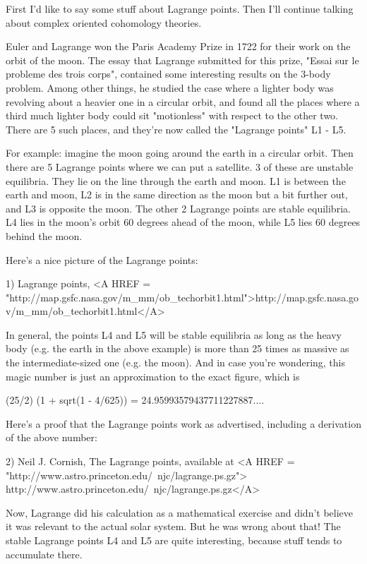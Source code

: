 

First I'd like to say some stuff about Lagrange points.  Then I'll
continue talking about complex oriented cohomology theories.

Euler and Lagrange won the Paris Academy Prize in 1722 for their work 
on the orbit of the moon.  The essay that Lagrange submitted for this
prize, "Essai sur le probleme des trois corps", contained some
interesting results on the 3-body problem.  Among other things, he
studied the case where a lighter body was revolving about a heavier one
in a circular orbit, and found all the places where a third much lighter
body could sit "motionless" with respect to the other two.  
There are 5
such places, and they're now called the "Lagrange points" L1 - L5.  

For example: imagine the moon going around the earth in a circular
orbit.  Then there are 5 Lagrange points where we can put a satellite.
3 of these are unstable equilibria.  They lie on the line through the 
earth and moon.  L1 is between the earth and moon, L2 is in the same 
direction as the moon but a bit further out, and L3 is opposite the moon.  
The other 2 Lagrange points are stable equilibria.  L4 lies in the moon's
orbit 60 degrees ahead of the moon, while L5 lies 60 degrees behind the 
moon.  

Here's a nice picture of the Lagrange points: 

1) Lagrange points, <A HREF = "http://map.gsfc.nasa.gov/m_mm/ob_techorbit1.html">http://map.gsfc.nasa.gov/m_mm/ob_techorbit1.html</A>

In general, the points L4 and L5 will be stable equilibria as long as
the heavy body (e.g. the earth in the above example) is more than 
25 times as massive as the intermediate-sized one (e.g. the moon).  
And in case you're wondering, this magic number is just an approximation 
to the exact figure, which is 

(25/2) (1 + sqrt(1 - 4/625))   =   24.95993579437711227887....

Here's a proof that the Lagrange points work as advertised, including
a derivation of the above number:

2) Neil J. Cornish, The Lagrange points, available at
<A HREF = "http://www.astro.princeton.edu/~njc/lagrange.ps.gz">
http://www.astro.princeton.edu/~njc/lagrange.ps.gz</A>

Now, Lagrange did his calculation as a mathematical exercise and didn't 
believe it was relevant to the actual solar system.  But he was wrong
about that!  The stable Lagrange points L4 and L5 are quite interesting,
because stuff tends to accumulate there.
 
